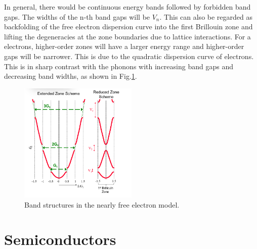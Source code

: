 \documentclass{article}
\theoremstyle{nonumberplain}
\begin{document}
In general, there would be continuous energy bands followed by forbidden band gaps. The widths of the n-th band gaps will be $V_n.$ This can also be regarded as backfolding of the free electron dispersion curve into the first Brillouin zone and lifting the degeneracies at the zone boundaries due to lattice interactions. For a electrons, higher-order zones will have a larger energy range and higher-order gaps will be narrower. This is due to the quadratic dispersion curve of electrons. This is in sharp contrast with the phonons with increasing band gaps and decreasing band widths, as shown in Fig.\ref{fig:band-structure}.
\begin{figure}[ht]
    \centering
    \includegraphics[width=0.5\textwidth]{figs/nfe-band-gaps.png}
    \caption{Band structures in the nearly free electron model.}
    \label{fig:band-structure}
\end{figure}
\section{Semiconductors}
\end{document}
